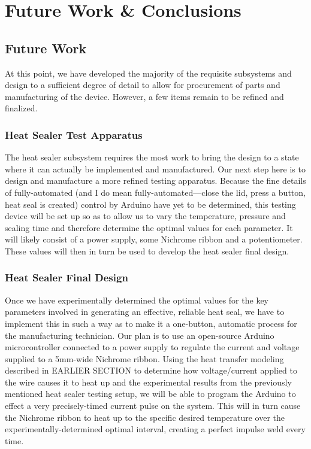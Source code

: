 \documentclass[12pt,letterpaper,notitlepage]{article}
\begin{document}
\section{Future Work \& Conclusions}
\subsection{Future Work}
At this point, we have developed the majority of the requisite subsystems and design to a sufficient degree of detail to allow for procurement of parts and manufacturing of the device. However, a few items remain to be refined and finalized.

\subsubsection{Heat Sealer Test Apparatus}
The heat sealer subsystem requires the most work to bring the design to a state where it can actually be implemented and manufactured. Our next step here is to design and manufacture a more refined testing apparatus. Because the fine details of fully-automated (and I do mean fully-automated---close the lid, press a button, heat seal is created) control by Arduino have yet to be determined, this testing device will be set up so as to allow us to vary the temperature, pressure and sealing time and therefore determine the optimal values for each parameter. It will likely consist of a power supply, some Nichrome ribbon and a potentiometer. These values will then in turn be used to develop the heat sealer final design.

\subsubsection{Heat Sealer Final Design}
Once we have experimentally determined the optimal values for the key parameters involved in generating an effective, reliable heat seal, we have to implement this in such a way as to make it a one-button, automatic process for the manufacturing technician. Our plan is to use an open-source Arduino microcontroller connected to a power supply to regulate the current and voltage supplied to a 5mm-wide Nichrome ribbon. Using the heat transfer modeling described in EARLIER SECTION to determine how voltage/current applied to the wire causes it to heat up and the experimental results from the previously mentioned heat sealer testing setup, we will be able to program the Arduino to effect a very precisely-timed current pulse on the system. This will in turn cause the Nichrome ribbon to heat up to the specific desired temperature over the experimentally-determined optimal interval, creating a perfect impulse weld every time.\\
\end{document}

